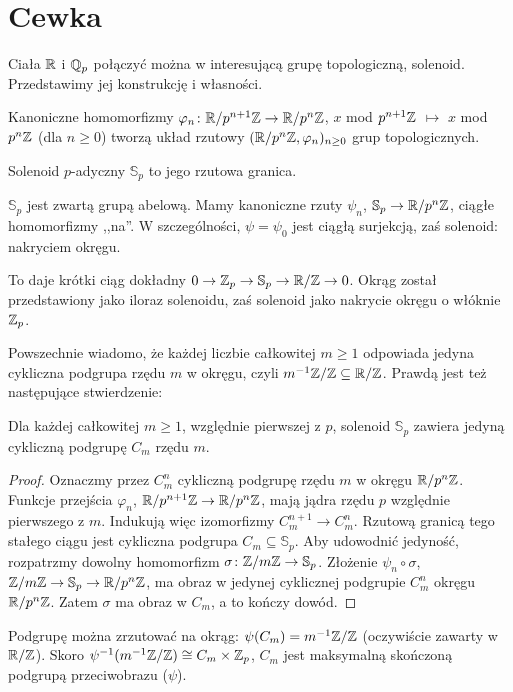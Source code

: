 \section{Cewka}
Ciała $\mathbb R$ i $\mathbb Q_p$ połączyć można w interesującą grupę topologiczną, solenoid.
Przedstawimy jej konstrukcję i własności.

Kanoniczne homomorfizmy $\varphi_n \colon \mathbb R/p^{n+1} \mathbb Z \to \mathbb R/p^n\mathbb Z$, $x$ mod $p^{n+1} \mathbb Z$ $\mapsto$ $x$ mod $p^n \mathbb Z$ (dla $n \ge 0$) tworzą układ rzutowy $(\mathbb R/p^n \mathbb Z, \varphi_n)_{n \ge 0}$ grup topologicznych.

\begin{definicja}
	{Solenoid $p$-adyczny} $\mathbb S_p$ to jego rzutowa granica.
\end{definicja}

$\mathbb S_p$ jest zwartą grupą abelową.
Mamy kanoniczne rzuty $\psi_n$, $\mathbb S_p \to \mathbb R/p^n\mathbb Z$, ciągłe homomorfizmy ,,na''. W szczególności, $\psi = \psi_0$ jest ciągłą surjekcją, zaś solenoid: nakryciem okręgu.

To daje krótki ciąg dokładny $0 \to \mathbb Z_p \to \mathbb S_p \to \mathbb R/\mathbb Z \to 0$.
Okrąg został przedstawiony jako iloraz solenoidu, zaś solenoid jako nakrycie okręgu o włóknie $\mathbb Z_p$.

Powszechnie wiadomo, że każdej liczbie całkowitej $m \ge 1$ odpowiada jedyna cykliczna podgrupa rzędu $m$ w okręgu, czyli $m^{-1} \mathbb Z/\mathbb Z \subseteq \mathbb R/\mathbb Z$. Prawdą jest też następujące stwierdzenie:

\begin{fakt}
	Dla każdej całkowitej $m \ge 1$, względnie pierwszej z $p$, solenoid $\mathbb S_p$ zawiera jedyną cykliczną podgrupę $C_m$ rzędu $m$.
\end{fakt}

\begin{proof}
	Oznaczmy przez $C_m^n$ cykliczną podgrupę rzędu $m$ w okręgu $\mathbb R/p^n \mathbb Z$. 
	Funkcje przejścia $\varphi_n$, $\mathbb R/p^{n+1} \mathbb Z \to \mathbb R/p^n\mathbb Z$, mają jądra rzędu $p$ względnie pierwszego z $m$.
	Indukują więc izomorfizmy $C_m^{n+1} \to C_m^n$.
	Rzutową granicą tego stałego ciągu jest cykliczna podgrupa $C_m \subseteq \mathbb S_p$.
	Aby udowodnić jedyność, rozpatrzmy dowolny homomorfizm $\sigma \colon \mathbb Z/m\mathbb Z \to \mathbb S_p$.
	Złożenie $\psi_n \circ\sigma$, $\mathbb Z/m\mathbb Z \to \mathbb S_p \to \mathbb R/p^n \mathbb Z$, ma obraz w jedynej cyklicznej podgrupie $C_m^n$ okręgu $\mathbb R/p^n\mathbb Z$.
	Zatem $\sigma$ ma obraz w $C_m$, a to kończy dowód.
\end{proof}

Podgrupę można zrzutować na okrąg: $\psi(C_m) = m^{-1} \mathbb Z/\mathbb Z$ (oczywiście zawarty w $\mathbb R/\mathbb Z$).
Skoro $\psi^{-1} (m^{-1}\mathbb Z/\mathbb Z) \cong C_m \times \mathbb Z_p$, $C_m$ jest maksymalną skończoną podgrupą przeciwobrazu ($\psi$).

